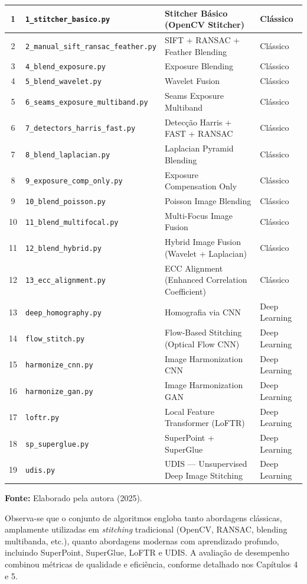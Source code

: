 \begin{anexosenv}
\begin{longtable}{|c|p{4cm}|p{7cm}|p{3cm}|}
1  & \texttt{1\_stitcher\_basico.py} & Stitcher Básico (OpenCV Stitcher) & Clássico \\ \hline
2  & \texttt{2\_manual\_sift\_ransac\_feather.py} & SIFT + RANSAC + Feather Blending & Clássico \\ \hline
3  & \texttt{4\_blend\_exposure.py} & Exposure Blending & Clássico \\ \hline
4  & \texttt{5\_blend\_wavelet.py} & Wavelet Fusion & Clássico \\ \hline
5  & \texttt{6\_seams\_exposure\_multiband.py} & Seams Exposure Multiband & Clássico \\ \hline
6  & \texttt{7\_detectors\_harris\_fast.py} & Detecção Harris + FAST + RANSAC & Clássico \\ \hline
7  & \texttt{8\_blend\_laplacian.py} & Laplacian Pyramid Blending & Clássico \\ \hline
8  & \texttt{9\_exposure\_comp\_only.py} & Exposure Compensation Only & Clássico \\ \hline
9  & \texttt{10\_blend\_poisson.py} & Poisson Image Blending & Clássico \\ \hline
10 & \texttt{11\_blend\_multifocal.py} & Multi-Focus Image Fusion & Clássico \\ \hline
11 & \texttt{12\_blend\_hybrid.py} & Hybrid Image Fusion (Wavelet + Laplacian) & Clássico \\ \hline
12 & \texttt{13\_ecc\_alignment.py} & ECC Alignment (Enhanced Correlation Coefficient) & Clássico \\ \hline
13 & \texttt{deep\_homography.py} & Homografia via CNN & Deep Learning \\ \hline
14 & \texttt{flow\_stitch.py} & Flow-Based Stitching (Optical Flow CNN) & Deep Learning \\ \hline
15 & \texttt{harmonize\_cnn.py} & Image Harmonization CNN & Deep Learning \\ \hline
16 & \texttt{harmonize\_gan.py} & Image Harmonization GAN & Deep Learning \\ \hline
17 & \texttt{loftr.py} & Local Feature Transformer (LoFTR) & Deep Learning \\ \hline
18 & \texttt{sp\_superglue.py} & SuperPoint + SuperGlue & Deep Learning \\ \hline
19 & \texttt{udis.py} & UDIS — Unsupervised Deep Image Stitching & Deep Learning \\ \hline

\end{longtable}
\noindent\textbf{Fonte:} Elaborado pela autora (2025).

\vspace{0.8cm}

Observa-se que o conjunto de algoritmos engloba tanto abordagens clássicas, amplamente 
utilizadas em \textit{stitching} tradicional (OpenCV, RANSAC, blending multibanda, etc.), 
quanto abordagens modernas com aprendizado profundo, incluindo SuperPoint, SuperGlue, 
LoFTR e UDIS. A avaliação de desempenho combinou métricas de qualidade e eficiência, 
conforme detalhado nos Capítulos 4 e 5.

\end{anexosenv}
